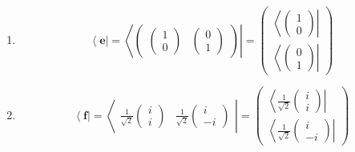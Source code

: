 \documentclass[aps,preprint]{revtex4}
\begin{document}
\begin{enumerate}
\item 
\begin{equation}
\left\langle \boldsymbol{e}\right\vert =\left\langle \left( 
\begin{array}{cc}
\left( 
\begin{array}{c}
1 \\ 
0%
\end{array}%
\right) & \left( 
\begin{array}{c}
0 \\ 
1%
\end{array}%
\right)%
\end{array}%
\right) \right\vert =\left( 
\begin{array}{c}
\left\langle \left( 
\begin{array}{c}
1 \\ 
0%
\end{array}%
\right) \right\vert \\ 
\left\langle \left( 
\begin{array}{c}
0 \\ 
1%
\end{array}%
\right) \right\vert%
\end{array}%
\right)
\end{equation}

\item 
\begin{equation}
\left\langle \boldsymbol{f}\right\vert =\left\langle 
\begin{array}{cc}
\frac{1}{\sqrt{2}}\left( 
\begin{array}{c}
i \\ 
i%
\end{array}%
\right) & \frac{1}{\sqrt{2}}\left( 
\begin{array}{c}
i \\ 
-i%
\end{array}%
\right)%
\end{array}%
\right\vert =\left( 
\begin{array}{c}
\left\langle \frac{1}{\sqrt{2}}\left( 
\begin{array}{c}
i \\ 
i%
\end{array}%
\right) \right\vert \\ 
\left\langle \frac{1}{\sqrt{2}}\left( 
\begin{array}{c}
i \\ 
-i%
\end{array}%
\right) \right\vert%
\end{array}%
\right)
\end{equation}


\end{enumerate}
\end{document}
